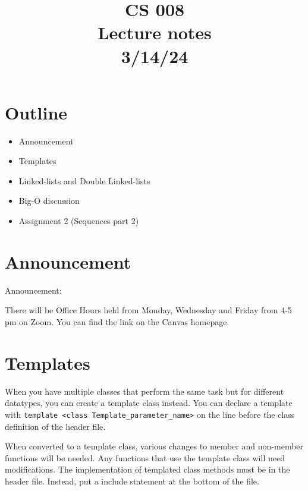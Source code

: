\documentclass[11pt,a4paper,english]{paper}
\begin{document}
\title{CS 008 \\ Lecture notes \\ 3/14/24}
\maketitle

\section{Outline}
\begin{itemize}
  \item Announcement
  \item Templates
  \item Linked-lists and Double Linked-lists
  \item Big-O discussion
  \item Assignment 2 (Sequences part 2)

\end{itemize}

\section{Announcement}
\begin{gbox}{Announcement:}{

  There will be Office Hours held from Monday, Wednesday and Friday from 4-5 pm on Zoom. You can find the link on the Canvas homepage.

}\end{gbox}

\section{Templates}

When you have multiple classes that perform the same task but for different datatypes, you can create a template class instead. You can declare a template with \texttt{template <class Template_parameter_name>} on the line before the class definition of the header file.

\bigskip

\noindent When converted to a template class, various changes to member and non-member functions will be needed. Any functions that use the template class will need modifications. The implementation of templated class methods must be in the header file. Instead, put a include statement at the bottom of the file.

\bigskip
\end{document}

